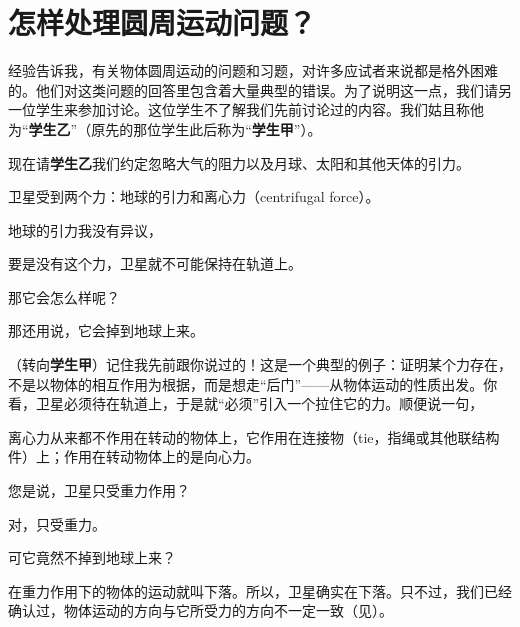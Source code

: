 \chapter[怎样处理圆周运动问题？]{怎样处理圆周运动问题？\label{ch-08}}

\begin{dialogue}

\tchr 经验告诉我，有关物体圆周运动的问题和习题，对许多应试者来说都是格外困难的。他们对这类问题的回答里包含着大量典型的错误。为了说明这一点，我们请另一位学生来参加讨论。这位学生不了解我们先前讨论过的内容。我们姑且称他为“\textbf{学生乙}”（原先的那位学生此后称为“\textbf{学生甲}”）。

现在请\textbf{学生乙}我们约定忽略大气的阻力以及月球、太阳和其他天体的引力。

\stdb 卫星受到两个力：地球的引力和离心力（centrifugal force）。

\tchr 地球的引力我没有异议，

\stdb 要是没有这个力，卫星就不可能保持在轨道上。

\tchr 那它会怎么样呢？

\stdb 那还用说，它会掉到地球上来。

\tchr （转向\textbf{学生甲}）记住我先前跟你说过的！这是一个典型的例子：证明某个力存在，不是以物体的相互作用为根据，而是想走“后门”——从物体运动的性质出发。你看，卫星必须待在轨道上，于是就“必须”引入一个拉住它的力。顺便说一句，

\stda 离心力从来都不作用在转动的物体上，它作用在连接物（tie，指绳或其他联结构件）上；作用在转动物体上的是向心力。

\stdb 您是说，卫星只受重力作用？

\tchr 对，只受重力。

\stdb 可它竟然不掉到地球上来？

\tchr 在重力作用下的物体的运动就叫下落。所以，卫星确实在下落。只不过，我们已经确认过，物体运动的方向与它所受力的方向不一定一致（见）。


\end{dialogue}
